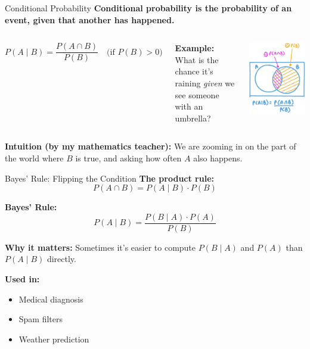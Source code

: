 \documentclass[handout,aspectratio=169]{beamer}
\begin{document}
\begin{frame}{Conditional Probability}
  \textbf{Conditional probability is the probability of an event, given that another has happened.}

  \vspace{1em}
  \begin{columns}
\[
    P(A \mid B) = \frac{P(A \cap B)}{P(B)} \quad \text{(if } P(B) > 0\text{)}
  \]

  \vspace{1em}
  \textbf{Example:} What is the chance it’s raining \textit{given} we see someone with an umbrella?
  
\includegraphics[width=0.6\linewidth]{chapter_figs/01_figs/conditional.png}
    
\end{columns}
  

  \vspace{1em}
  \textbf{Intuition (by my mathematics teacher):} We are zooming in on the part of the world where $B$ is true, and asking how often $A$ also happens.
\end{frame}

\begin{frame}{Bayes' Rule: Flipping the Condition}
  \textbf{The product rule:}
  \[
    P(A \cap B) = P(A \mid B) \cdot P(B)
  \]

  \vspace{1em}
  \textbf{Bayes' Rule:}
  \[
    P(A \mid B) = \frac{P(B \mid A) \cdot P(A)}{P(B)}
  \]

  \vspace{1em}
  \textbf{Why it matters:} Sometimes it's easier to compute $P(B \mid A)$ and $P(A)$ than $P(A \mid B)$ directly.

  \vspace{1em}
  \textbf{Used in:}
  \begin{itemize}
    \item Medical diagnosis
    \item Spam filters
    \item Weather prediction
  \end{itemize}
\end{frame}
\end{document}
